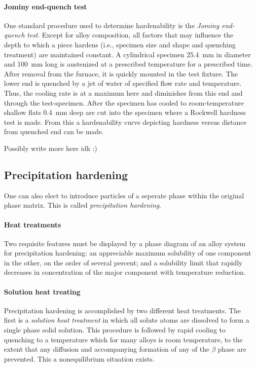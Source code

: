 \paragraph{Jominy end-quench test} One standard procedure used to determine hardenability is the \textit{Jominy end-quench test}. Except for alloy composition, all factors that may influence the depth to which a piece hardens (i.e., specimen size and shape and quenching treatment) are maintained constant. A cylindrical specimen \qty{25,4}{mm} in diameter and \qty{100}{mm} long is austenized at a prescribed temperature for a prescribed time. After removal from the furnace, it is quickly mounted in the test fixture. The lower end is quenched by a jet of water of specified flow rate and temperature. Thus, the cooling rate is at a maximum here and diminishes from this end and through the test-specimen. After the specimen has cooled to room-temperature shallow flats \qty{0,4}{mm} deep are cut into the specimen where a Rockwell hardness test is made. From this a hardenability curve depicting hardness versus distance from quenched end can be made. 

Possibly write more here idk :)


\subsection{Precipitation hardening}
One can also elect to introduce particles of a seperate phase within the original phase matrix. This is called \textit{precipitation hardening}. 

\paragraph{Heat treatments} Two requisite features must be displayed by a phase diagram of an alloy system for precipitation hardening: an appreciable maximum solubility of one component in the other, on the order of several percent; and a solubility limit that rapidly decreases in concentration of the major component with temperature reduction. 

\paragraph{Solution heat treating} Precipitation hardening is accomplished by two different heat treatments. The first is a \textit{solution heat treatment} in which all solute atoms are dissolved to form a single phase solid solution. This procedure is followed by rapid cooling to quenching to a temperature which for many alloys is room temperature, to the extent that any diffusion and accompanying formation of any of the $\beta$ phase are prevented. This a nonequilibrium situation exists.

